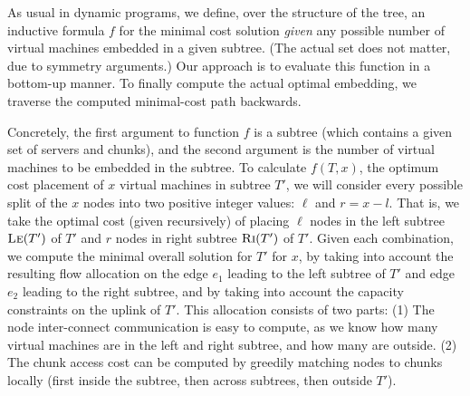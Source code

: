 \documentclass[9pt,twocolumn]{scrartcl}
\begin{document}
As usual in dynamic programs, we define, over the structure of the tree, an inductive formula $f$ for
the minimal cost solution \emph{given} any possible number of virtual
machines embedded in a given subtree. (The actual set does not matter,
due to symmetry arguments.) 
Our approach is to evaluate this function in a bottom-up
manner.  
To finally compute the actual optimal embedding, 
we traverse the computed minimal-cost path backwards.

Concretely, the first argument to function $f$ 
is a subtree (which contains a given set of servers and chunks), 
and the
second argument is the number of virtual machines to be embedded in the subtree.
To calculate $f(T, x)$, the optimum
cost placement of $x$ virtual machines in subtree $T'$, we will
consider every possible split of the $x$ nodes into two positive integer
values: $\ell$ and $r = x - l$. That is, we take the optimal cost 
(given recursively) of placing $\ell$ nodes in
the left subtree $\textsc{Le}(T')$ of $T'$ and $r$ nodes in right subtree $\textsc{Ri}(T')$ of
$T'$. Given each combination, we compute the minimal overall solution for $T'$
for $x$, by taking into account the resulting flow allocation on the edge $e_{1}$ 
leading to the left subtree of $T'$ and 
edge $e_2$ leading to the right subtree, and by
taking into account the capacity constraints on the uplink of $T'$.
This allocation consists of two parts: (1) The node inter-connect
communication is easy to compute, as we know how many
virtual machines are in the left and right subtree, and how many are 
outside. 
(2) The chunk access cost
can be computed by greedily matching nodes to chunks locally (first
inside the subtree, then across subtrees, then outside $T'$).

\end{document}
